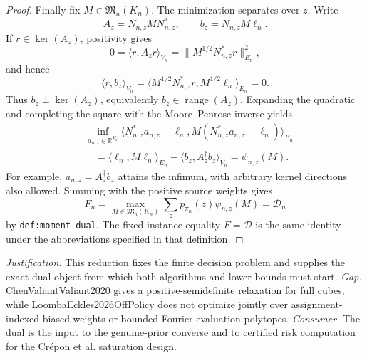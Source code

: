 \documentclass{article}
\begin{document}
\begin{proof}
Finally fix \(M\in\mathfrak M_n(K_n)\).  The minimization separates over \(z\).  Write
\[
 A_z=N_{n,z}MN_{n,z}^{\ast},
 \qquad b_z=N_{n,z}M\ell_n.
\]
If \(r\in\ker(A_z)\), positivity gives
\[
 0=\langle r,A_zr\rangle_{V_n}
   =\|M^{1/2}N_{n,z}^{\ast}r\|_{E_n}^2,
\]
and hence
\[
 \langle r,b_z\rangle_{V_n}
 =\langle M^{1/2}N_{n,z}^{\ast}r,M^{1/2}\ell_n\rangle_{E_n}=0.
\]
Thus \(b_z\perp\ker(A_z)\), equivalently \(b_z\in\operatorname{range}(A_z)\).  Expanding the quadratic and completing the square with the Moore--Penrose inverse yields
\[
\begin{aligned}
 &\inf_{a_{n,z}\in\mathbb R^{V_n}}
 \langle N_{n,z}^{\ast}a_{n,z}-\ell_n,
 M(N_{n,z}^{\ast}a_{n,z}-\ell_n)\rangle_{E_n}\\
 &\quad=\langle\ell_n,M\ell_n\rangle_{E_n}
 -\langle b_z,A_z^{\dagger}b_z\rangle_{V_n}
 =\psi_{n,z}(M).
\end{aligned}
\]
For example, \(a_{n,z}=A_z^{\dagger}b_z\) attains the infimum, with arbitrary kernel directions also allowed.  Summing with the positive source weights gives
\[
 F_n=\max_{M\in\mathfrak M_n(K_n)}
       \sum_zp_{\pi_n}(z)\psi_{n,z}(M)=\mathcal D_n
\]
by \texttt{def:moment-dual}.  The fixed-instance equality \(F=\mathcal D\) is the same identity under the abbreviations specified in that definition.
\end{proof}
\par\smallskip\noindent \textit{Justification.} This reduction fixes the finite decision problem and supplies the exact dual object from which both algorithms and lower bounds must start. \textit{Gap.} ChenValiantValiant2020 gives a positive-semidefinite relaxation for full cubes, while LoombaEckles2026OffPolicy does not optimize jointly over assignment-indexed biased weights or bounded Fourier evaluation polytopes. \textit{Consumer.} The dual is the input to the genuine-prior converse and to certified risk computation for the Crépon et al. saturation design.
\end{document}
